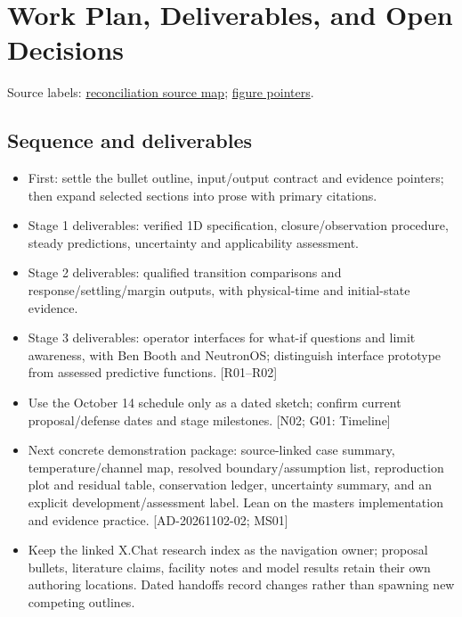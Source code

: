 \section{Work Plan, Deliverables, and Open Decisions}
\noindent\small Source labels: \href{run:doc_support/reconciliation/2026-11-02/SOURCES.md}{reconciliation source map}; \href{run:doc_support/reconciliation/2026-11-02/FIGURE_POINTERS.md}{figure pointers}.\normalsize

\subsection{Sequence and deliverables}
\begin{itemize}[leftmargin=*]
\item First: settle the bullet outline, input/output contract and evidence pointers; then expand selected sections into prose with primary citations.
\item Stage 1 deliverables: verified 1D specification, closure/observation procedure, steady predictions, uncertainty and applicability assessment.
\item Stage 2 deliverables: qualified transition comparisons and response/settling/margin outputs, with physical-time and initial-state evidence.
\item Stage 3 deliverables: operator interfaces for what-if questions and limit awareness, with Ben Booth and NeutronOS; distinguish interface prototype from assessed predictive functions. [R01--R02]
\item Use the October 14 schedule only as a dated sketch; confirm current proposal/defense dates and stage milestones. [N02; G01: Timeline]
\item Next concrete demonstration package: source-linked case summary, temperature/channel map, resolved boundary/assumption list, reproduction plot and residual table, conservation ledger, uncertainty summary, and an explicit development/assessment label. Lean on the master\textquotesingle{}s implementation and evidence practice. [AD-20261102-02; MS01]
\item Keep the linked X.Chat research index as the navigation owner; proposal bullets, literature claims, facility notes and model results retain their own authoring locations. Dated handoffs record changes rather than spawning new competing outlines.
\end{itemize}

